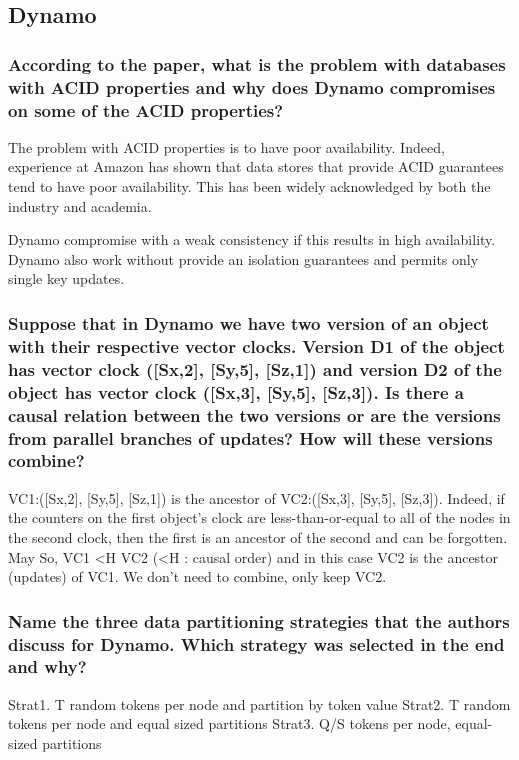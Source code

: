 \subsection{Dynamo}

\subsubsection*{According to the paper, what is the problem with databases
with ACID properties and why does Dynamo compromises on some of the ACID
properties?}

The problem with ACID properties is to have poor availability. Indeed,
experience at Amazon has shown that data stores that provide ACID
guarantees tend to have poor availability. This has been widely
acknowledged by both the industry and academia.

Dynamo compromise with a weak consistency if this results in high
availability.
Dynamo also work without provide an isolation guarantees and permits
only single key updates.

\subsubsection*{Suppose that in Dynamo we have two version of an object
with their respective vector clocks. Version D1 of the object has vector
clock ([Sx,2], [Sy,5], [Sz,1]) and version D2 of the object has vector
clock ([Sx,3], [Sy,5], [Sz,3]). Is there a causal relation between the
two versions or are the versions from parallel branches of updates? How
will these versions combine?}

VC1:([Sx,2], [Sy,5], [Sz,1]) is the ancestor of VC2:([Sx,3], [Sy,5],
[Sz,3]). 
Indeed, if the counters on the first object’s clock are
less-than-or-equal to all of the nodes in the second clock, then the
first is an ancestor of the second and can be forgotten.
May
So, VC1 <H VC2 (<H : causal order) and in this case VC2 is the ancestor
(updates) of VC1. We don't need to combine, only keep VC2.

\subsubsection*{Name the three data partitioning strategies that the
authors discuss for Dynamo. Which strategy was selected in the end and
why?}

Strat1. T random tokens per node and partition by token value
Strat2. T random tokens per node and equal sized partitions
Strat3. Q/S tokens per node, equal-sized partitions

